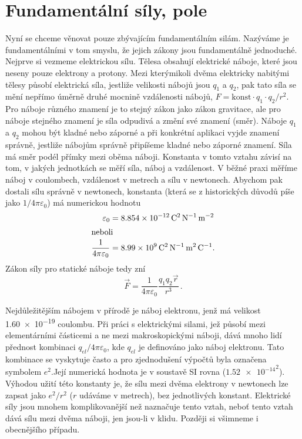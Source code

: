   \section{Fundamentální síly, pole}\label{fyz:IchapXIIsecIV}
    Nyní se chceme věnovat pouze zbývajícím fundamentálním silám. Nazýváme je fundamentálními v tom 
    smyslu, že jejich zákony jsou fundamentálně jednoduché. Nejprve si vezmeme elektrickou sílu. 
    Tělesa obsahují elektrické náboje, které jsou neseny pouze elektrony a protony. Mezi 
    kterýmikoli dvěma elektricky nabitými tělesy působí elektrická síla, jestliže velikosti nábojů 
    jsou \(q_1\) a \(q_2\), pak tato síla se mění nepřímo úměrně druhé mocnině vzdálenosti nábojů, 
    \(F=\text{konst}\cdot q_1\cdot q_2/r^2\). Pro náboje různého znamení je to stejný zákon jako 
    zákon gravitace, ale pro náboje stejného znamení je síla odpudivá a změní své znamení (směr). 
    Náboje \(q_1\) a \(q_2\) mohou být kladné nebo záporné a při konkrétní aplikaci vyjde znamení 
    správně, jestliže nábojům správně připíšeme kladné nebo záporné znamení. Síla má směr podél 
    přímky mezi oběma náboji. Konstanta v tomto vztahu závisí na tom, v jakých jednotkách se měří 
    síla, náboj a vzdálenost. V běžné praxi měříme náboj v coulombech, vzdálenost v metrech a sílu 
    v newtonech. Abychom pak dostali sílu správně v newtonech, konstanta (která se z historických 
    důvodů píše jako \(1/4\pi\varepsilon_0\)) má numerickou hodnotu
    \begin{subequations}
    \label{FYZ:eq170}
      \begin{align}
        \varepsilon_0 
          &= \SI{8.854e-12}{\square\coulomb\per\newton\per\square\m}          \label{FYZ:eq170a} \\
        \shortintertext{neboli}
        \frac{1}{4\pi\varepsilon_0} 
          &= \SI{8.99e9}{\square\coulomb\per\newton\square\m\per\coulomb}.    \label{FYZ:eq170b}
      \end{align}
    \end{subequations}
    Zákon síly pro statické náboje tedy zní
    \begin{equation}\label{FYZ:eq171}
      \boxed{\vec{F} = \frac{1}{4\pi\varepsilon_0}\frac{q_1q_2\vec{r}}{r^3}}\,. 
    \end{equation}
    
    Nejdůležitějším nábojem v přírodě je náboj elektronu, jenž má velikost \num{1.60e-19} coulombu. 
    Při práci s elektrickými silami, jež působí mezi elementárními částicemi a ne mezi 
    makroskopickými náboji, dává mnoho lidí přednost kombinaci \(q_{el}/4\pi\varepsilon_0\), kde 
    \(q_{el}\) je definováno jako náboj elektronu. Tato kombinace se vyskytuje často a pro 
    zjednodušení výpočtů byla označena symbolem \(e^2\).Její numerická hodnota je v soustavě SI 
    rovna (\(\num{1.52e-14}^2\)). Výhodou užití této konstanty je, že sílu mezi dvěma elektrony v 
    newtonech lze zapsat jako \(e^2/r^2\) (\(r\) udáváme v metrech), bez jednotlivých konstant. 
    Elektrické síly jsou mnohem komplikovanější než naznačuje tento vztah, neboť tento vztah dává 
    sílu mezi dvěma náboji, jen jsou-li v klidu. Později si všimneme i obecnějšího případu.
  

